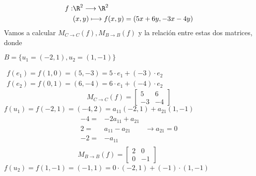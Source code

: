 \begin{align*}
	f:&\R^2\longrightarrow\R^2\\
	&(x,y)\longmapsto f(x,y)=(5x+6y,-3x-4y)
\end{align*}
Vamos a calcular $M_{C\to C}(f),M_{B\to B}(f)$ y la relación entre estas dos matrices, donde 

$B=\{u_1=(-2,1),u_2=(1,-1)\}$


$\begin{array}{l}
	f(e_1)=f(1,0)=(5,-3)=5\cdot e_1+(-3)\cdot e_2\\
	f(e_2)=f(0,1)=(6,-4)=6\cdot e_1+(-4)\cdot e_2
\end{array}$\[ M_{C\to C}(f)=\begin{bmatrix}
	5 & 6\\
	-3 & -4
\end{bmatrix} \]$f(u_1)=f(-2,1)=(-4,2)=a_{11}(-2,1)+a_{21}(1,-1)$\[ \begin{array}{c}
	\begin{array}{rl}
		-4=&-2a_{11}+a_{21}\\
		2=&a_{11}-a_{21}\\ \hline
		-2=&-a_{11}
	\end{array}\begin{array}{l}
		\\
		\longrightarrow a_{21}=0\\
	\end{array}\\
	M_{B\to B}(f)=\begin{bmatrix}
		2 & 0\\
		0 & -1
	\end{bmatrix}
\end{array} \]
$f(u_2)=f(1,-1)=(-1,1)=0\cdot (-2,1)+(-1)\cdot(1,-1)$


